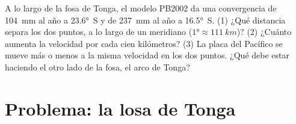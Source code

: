 \begin{exercise}[$\star\star\star$]\label{exo:g11:subduction-zones:15}
A lo largo de la fosa de Tonga, el modelo PB2002 da una convergencia de
\qty{104}{mm} al año a \ang{23.6}~S y de \qty{237}{mm} al año a
\ang{16.5}~S. (1) ¿Qué distancia separa los dos puntos, a lo largo de un
meridiano ($\ang{1} \approx \qty{111}{km}$)? (2) ¿Cuánto aumenta la velocidad
por cada cien kilómetros? (3) La placa del Pacífico se mueve más o menos a la
misma velocidad en los dos puntos. ¿Qué debe estar haciendo el otro lado de la
fosa, el arco de Tonga?
\end{exercise}

\section{Problema: la losa de Tonga}

